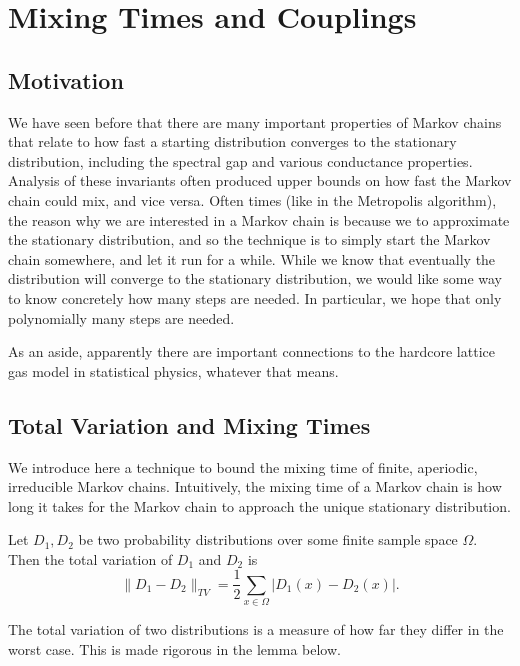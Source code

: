 \section{Mixing Times and Couplings}
\subsection{Motivation}
We have seen before that there are many important properties of Markov chains that relate to how fast a starting distribution converges to the stationary distribution, including the spectral gap and various conductance properties. Analysis of these invariants often produced upper bounds on how fast the Markov chain could mix, and vice versa. Often times (like in the Metropolis algorithm), the reason why we are interested in a Markov chain is because we to approximate the stationary distribution, and so the technique is to simply start the Markov chain somewhere, and let it run for a while. While we know that eventually the distribution will converge to the stationary distribution, we would like some way to know concretely how many steps are needed. In particular, we hope that only polynomially many steps are needed.

As an aside, apparently there are important connections to the hardcore lattice gas model in statistical physics, whatever that means.

\subsection{Total Variation and Mixing Times}
We introduce here a technique to bound the mixing time of finite, aperiodic, irreducible Markov chains. Intuitively, the mixing time of a Markov chain is how long it takes for the Markov chain to approach the unique stationary distribution.
\begin{definition}
Let $D_1, D_2$ be two probability distributions over some finite sample space $\Omega$. Then the total variation of $D_1$ and $D_2$ is
\[\| D_1 - D_2 \|_{TV} = \frac{1}{2} \sum_{x \in \Omega} |D_1 (x) - D_2 (x)|.\]
\end{definition}

The total variation of two distributions is a measure of how far they differ in the worst case. This is made rigorous in the lemma below.

